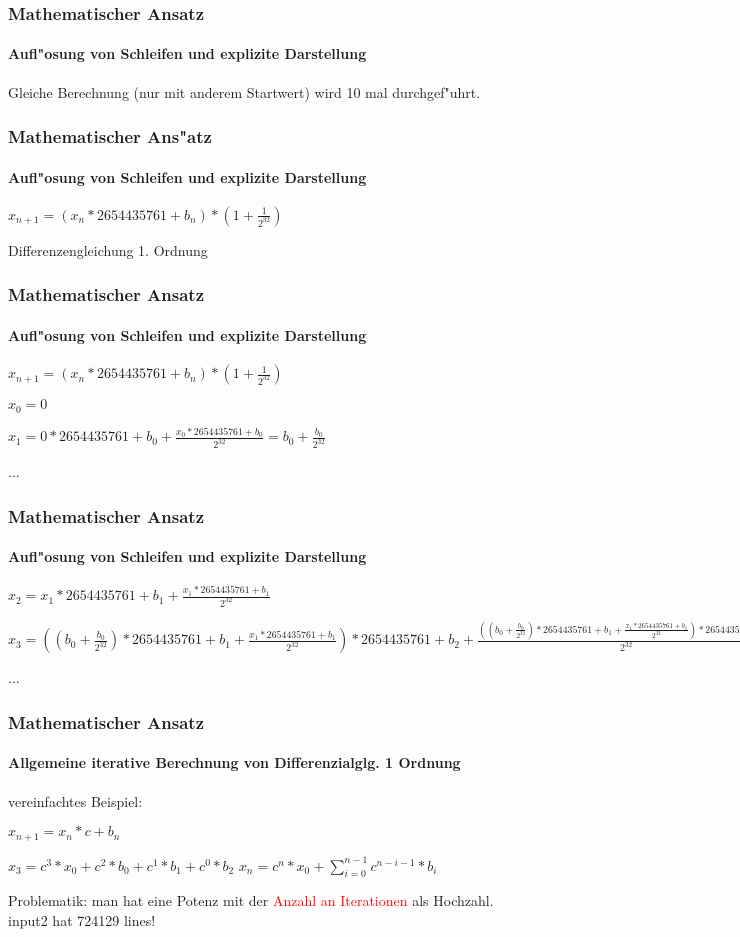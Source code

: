 \documentclass{beamer}
\newcommand{\fail}[1]{\textcolor{red}{#1}}
\begin{document}
\begin{frame}
  	\frametitle{Mathematischer Ansatz}
  	\framesubtitle{Aufl"osung von Schleifen und explizite Darstellung}
  	\duploop
		

		Gleiche Berechnung (nur mit anderem Startwert) wird 10 mal durchgef"uhrt.
\end{frame}

\begin{frame}
  	\frametitle{Mathematischer Ans"atz}
  	\framesubtitle{Aufl"osung von Schleifen und explizite Darstellung}
  	\diffgleichung
		
		$x_{n+1} = (x_{n} * 2654435761 + b_{n}) * (1 + \frac{1}{2^{32}})$


	Differenzengleichung 1. Ordnung
\end{frame}

\begin{frame}
  	\frametitle{Mathematischer Ansatz}
  	\framesubtitle{Aufl"osung von Schleifen und explizite Darstellung}
  	\diffgleichung
		
		$x_{n+1} = (x_{n} * 2654435761 + b_{n}) * (1 + \frac{1}{2^{32}})$

$x_{0} = 0$

$x_{1} = 0 * 2654435761 + b_{0} + \frac{x_{0}*2654435761 + b_{0}}{2 ^{32}} = b_{0} +  \frac{b_{0}}{2 ^{32}}  $

...

\end{frame}

\begin{frame}
  	\frametitle{Mathematischer Ansatz}
  	\framesubtitle{Aufl"osung von Schleifen und explizite Darstellung}

$x_{2} = x_{1} * 2654435761 + b_{1} + \frac{x_{1}*2654435761 + b_{1}}{2^{32}}$

$x_{3} = ((b_{0} +  \frac{b_{0}}{2 ^{32}}) * 2654435761 + b_{1} + \frac{x_{1}*2654435761 + b_{1}}{2^{32}}) * 2654435761 + b_{2} + \frac{((b_{0} +  \frac{b_{0}}{2 ^{32}}) * 2654435761 + b_{1} + \frac{x_{1}*2654435761 + b_{1}}{2^{32}})*2654435761 + b_{2}}{2^{32}}$

...

\end{frame}

\begin{frame}
  	\frametitle{Mathematischer Ansatz}
  	\framesubtitle{Allgemeine iterative Berechnung von Differenzialglg. 1 Ordnung}
	vereinfachtes Beispiel:

	$x_{n+1} = x_{n}* c + b_{n}$
	
	$x_{3} = c^3 * x_{0} + c^2 * b_{0} + c^1 * b_{1} + c^0 * b_{2}$
	$x_{n} = c^n * x_{0} + \sum_{i=0}^{n-1} c^{n-i-1} * b_{i}$

Problematik: man hat eine Potenz mit der \fail{Anzahl an Iterationen} als Hochzahl.
input2 hat 724129 lines!

\end{frame}
\end{document}
